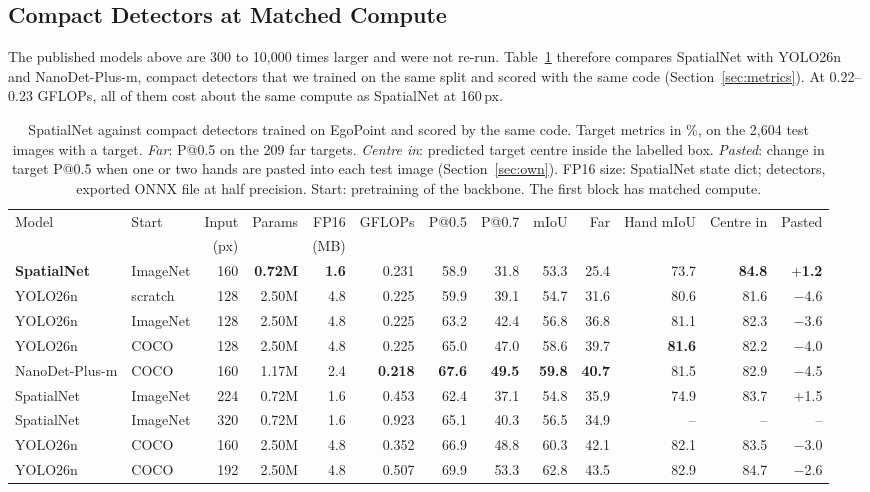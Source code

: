 \subsection{Compact Detectors at Matched Compute}\label{sec:detectors}

The published models above are 300 to 10{,}000 times larger and were not re-run. Table~\ref{tab:detectors} therefore compares SpatialNet with YOLO26n and NanoDet-Plus-m, compact detectors that we trained on the same split and scored with the same code (Section~\ref{sec:metrics}). At 0.22--0.23 GFLOPs, all of them cost about the same compute as SpatialNet at 160\,px.

\begin{table}[t]
  \caption{SpatialNet against compact detectors trained on EgoPoint and scored by the same code. Target metrics in \%, on the 2,604 test images with a target. \emph{Far}: P@0.5 on the 209 far targets. \emph{Centre in}: predicted target centre inside the labelled box. \emph{Pasted}: change in target P@0.5 when one or two hands are pasted into each test image (Section~\ref{sec:own}). FP16 size: SpatialNet state dict; detectors, exported ONNX file at half precision. Start: pretraining of the backbone. The first block has matched compute.}
  \label{tab:detectors}
  \footnotesize
  \setlength{\tabcolsep}{2.1pt}
  \begin{tabular}{llrrrrrrrrrrr}
    \toprule
    Model & Start & Input & Params & FP16 & GFLOPs & P@0.5 & P@0.7 & mIoU & Far & Hand mIoU & Centre in & Pasted \\
    & & (px) & & (MB) & & & & & & & & \\
    \midrule
    \textbf{SpatialNet} & ImageNet & 160 & \textbf{0.72M} & \textbf{1.6} & 0.231 & 58.9 & 31.8 & 53.3 & 25.4 & 73.7 & \textbf{84.8} & \textbf{$+$1.2} \\
    YOLO26n & scratch & 128 & 2.50M & 4.8 & 0.225 & 59.9 & 39.1 & 54.7 & 31.6 & 80.6 & 81.6 & $-$4.6 \\
    YOLO26n & ImageNet & 128 & 2.50M & 4.8 & 0.225 & 63.2 & 42.4 & 56.8 & 36.8 & 81.1 & 82.3 & $-$3.6 \\
    YOLO26n & COCO & 128 & 2.50M & 4.8 & 0.225 & 65.0 & 47.0 & 58.6 & 39.7 & \textbf{81.6} & 82.2 & $-$4.0 \\
    NanoDet-Plus-m & COCO & 160 & 1.17M & 2.4 & \textbf{0.218} & \textbf{67.6} & \textbf{49.5} & \textbf{59.8} & \textbf{40.7} & 81.5 & 82.9 & $-$4.5 \\
    \midrule
    SpatialNet & ImageNet & 224 & 0.72M & 1.6 & 0.453 & 62.4 & 37.1 & 54.8 & 35.9 & 74.9 & 83.7 & $+$1.5 \\
    SpatialNet & ImageNet & 320 & 0.72M & 1.6 & 0.923 & 65.1 & 40.3 & 56.5 & 34.9 & -- & -- & -- \\
    YOLO26n & COCO & 160 & 2.50M & 4.8 & 0.352 & 66.9 & 48.8 & 60.3 & 42.1 & 82.1 & 83.5 & $-$3.0 \\
    YOLO26n & COCO & 192 & 2.50M & 4.8 & 0.507 & 69.9 & 53.3 & 62.8 & 43.5 & 82.9 & 84.7 & $-$2.6 \\
    \bottomrule
  \end{tabular}
\end{table}

